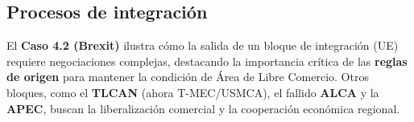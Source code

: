 \subsection{Procesos de integración}
El \textbf{Caso 4.2 (Brexit)} ilustra cómo la salida de un bloque de integración (UE) requiere negociaciones complejas, destacando la importancia crítica de las \textbf{reglas de origen} para mantener la condición de Área de Libre Comercio. Otros bloques, como el \textbf{TLCAN} (ahora T-MEC/USMCA), el fallido \textbf{ALCA} y la \textbf{APEC}, buscan la liberalización comercial y la cooperación económica regional.
